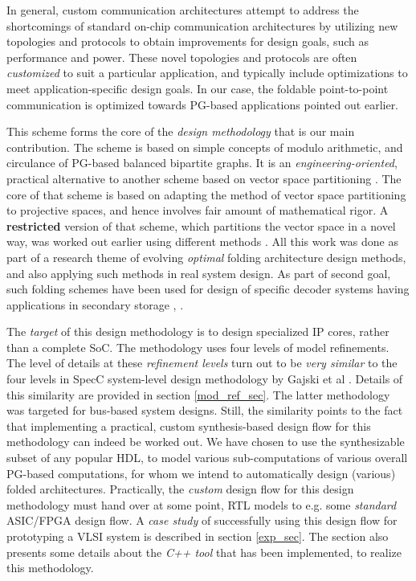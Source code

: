 \documentclass[12pt]{article}
\begin{document}
In general, custom communication architectures attempt to address the
shortcomings of standard on-chip communication architectures by utilizing
new topologies and protocols to obtain improvements for design goals, such
as performance and power. These novel topologies and protocols are often
\textit{customized} to suit a particular application, and
typically include optimizations to meet application-specific design goals.
In our case, the
foldable point-to-point communication is optimized towards PG-based
applications pointed out earlier.

This scheme forms the core of the \textit{design methodology} that is our main
contribution. The scheme is based on simple concepts of
modulo arithmetic, and circulance of PG-based balanced bipartite
graphs. It is an \textit{engineering-oriented},
practical alternative to another scheme based on vector space partitioning
\cite{dam_pap}. The core of that scheme is based on adapting the method of
vector space partitioning \cite{vs_part} to projective spaces, and
hence involves fair amount of mathematical rigor. A
\textbf{restricted} version of that scheme, which partitions the vector
space in a novel way, was worked out earlier using different methods
\cite{cacs_pap}. All this work was done as part of a research theme of
evolving \textit{optimal} folding architecture design methods, and also
applying such methods in real system design. As part of second goal, such
folding schemes have been used for design of specific decoder systems
having applications in secondary storage \cite{ldpc_foldpat}, \cite{expanders}.

The \textit{target} of this design methodology is to design specialized IP cores,
rather than a complete SoC. The methodology uses four levels of model
refinements. The level of details at these \textit{refinement levels} turn
out to be \textit{very similar} to the four levels in SpecC system-level
design methodology by Gajski et al \cite{spec_c_methodology}. Details of
this similarity are provided in section \ref{mod_ref_sec}. The latter
methodology was targeted for bus-based system designs. Still, the
similarity points to the fact that implementing a practical, custom
synthesis-based design flow for this methodology can indeed be worked out.
We have chosen to use the synthesizable subset of any popular HDL, to model
various sub-computations of various overall PG-based computations, for whom
we intend to automatically design (various) folded architectures.
Practically, the \textit{custom} design flow for this design methodology must
hand over at some point, RTL models to e.g. some \textit{standard} ASIC/FPGA design
flow. A \textit{case study} of successfully using this
design flow for prototyping a VLSI system is described in section
\ref{exp_sec}. The section also presents some details about the \textit{C++
tool} that has been implemented, to realize this methodology.
\end{document}
